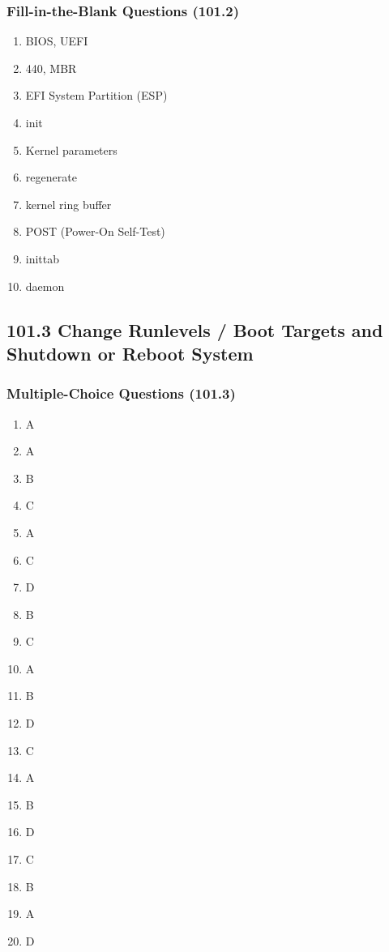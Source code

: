 \documentclass[12pt,a4paper]{report}
\begin{document}
\subsubsection*{Fill-in-the-Blank Questions (101.2)}
\begin{enumerate}[1.]
    \item BIOS, UEFI
    \item 440, MBR
    \item EFI System Partition (ESP)
    \item init
    \item Kernel parameters
    \item regenerate
    \item kernel ring buffer
    \item POST (Power-On Self-Test)
    \item inittab
    \item daemon
    \end{enumerate}


    \subsection*{101.3 Change Runlevels / Boot Targets and Shutdown or Reboot System}
    \subsubsection*{Multiple-Choice Questions (101.3)}
    \begin{enumerate}[1.]
    \item A
    \item A
    \item B
    \item C
    \item A
    \item C
    \item D
    \item B
    \item C
    \item A
    \item B
    \item D
    \item C
    \item A
    \item B
    \item D
    \item C
    \item B
    \item A
    \item D
    \end{enumerate}
\end{document}

